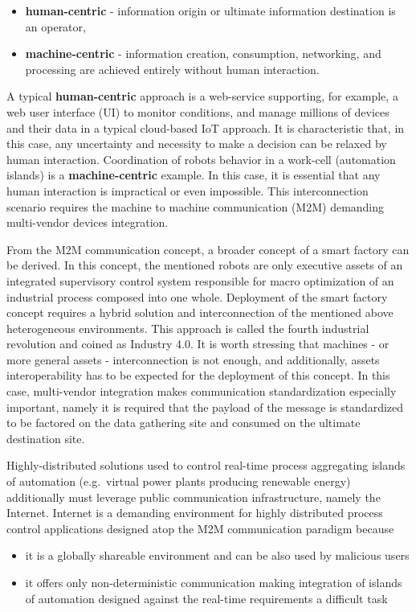 \documentclass{jacsart}
\begin{document}
\begin{itemize}
      \item \textbf{human-centric} - information origin or ultimate information destination is an operator,
      \item \textbf{machine-centric} - information creation, consumption, networking, and processing are achieved entirely without human interaction.
\end{itemize}

A typical \textbf{human-centric} approach is a web-service supporting, for example, a web user interface (UI) to monitor conditions, and manage millions of devices and their data in a typical cloud-based IoT approach. It is characteristic that, in this case, any uncertainty and necessity to make a decision can be relaxed by human interaction. Coordination of robots behavior in a work-cell (automation islands) is a \textbf{machine-centric} example. In this case, it is essential that any human interaction is impractical or even impossible. This interconnection scenario requires the machine to machine communication (M2M) demanding multi-vendor devices integration.

From the M2M communication concept, a broader concept of a smart factory can be derived. In this concept, the mentioned robots are only executive assets of an integrated supervisory control system responsible for macro optimization of an industrial process composed into one whole. Deployment of the smart factory concept requires a hybrid solution and interconnection of the mentioned above heterogeneous environments. This approach is called the fourth industrial revolution and coined as Industry 4.0. It is worth stressing that machines - or more general assets - interconnection is not enough, and additionally, assets interoperability has to be expected for the deployment of this concept. In this case, multi-vendor integration makes communication standardization especially important, namely it is required that the payload of the message is standardized to be factored on the data  gathering site and consumed on the ultimate destination site.

Highly-distributed solutions used to control real-time process aggregating islands of automation (e.g.~virtual power plants producing renewable energy) additionally must leverage public communication infrastructure, namely the Internet. Internet is a demanding environment for highly distributed process control applications designed atop the M2M communication paradigm because
\begin{itemize}
      \item it is a globally shareable environment and can be also used by malicious users
      \item it offers only non-deterministic communication making integration of islands of automation designed against the real-time requirements a difficult task
\end{itemize}
\end{document}
